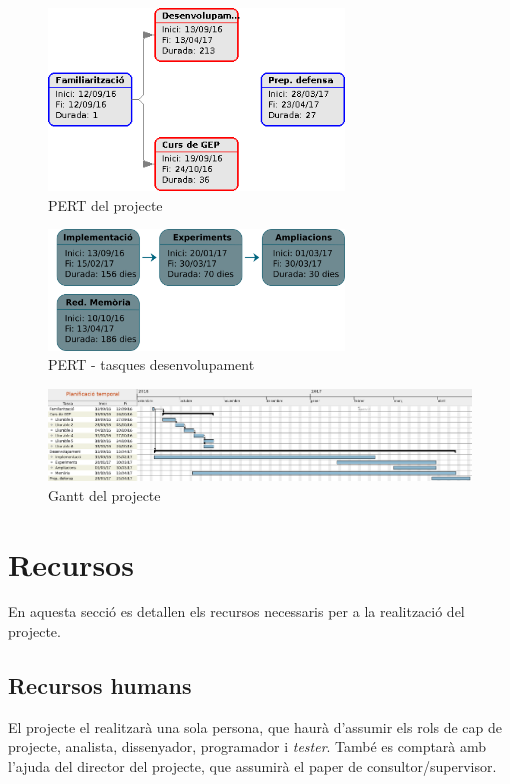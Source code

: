 		\begin{figure}[H]
			\centering
			\includegraphics[width=0.7\textwidth]{images/pert-global}
			\caption{PERT del projecte}
		\end{figure}
		\vspace{0.8cm}
		\begin{figure}[H]
			\centering
			\includegraphics[width=0.7\textwidth]{images/tasques}
			\caption{PERT - tasques desenvolupament}
		\end{figure}

		\restoregeometry
		\thispagestyle{empty}
		\begin{figure}
			\includegraphics[width=\textheight]{images/gantt}
			\caption{Gantt del projecte}
		\end{figure}
		\restoregeometry

\section{Recursos}
	En aquesta secció es detallen els recursos necessaris per a la realització del projecte. %
	\subsection{Recursos humans}
		El projecte el realitzarà una sola persona, que haurà d'assumir els rols de cap de projecte, analista, dissenyador, programador i \textit{tester}.
		També es comptarà amb l'ajuda del director del projecte, que assumirà el paper de consultor/supervisor.
